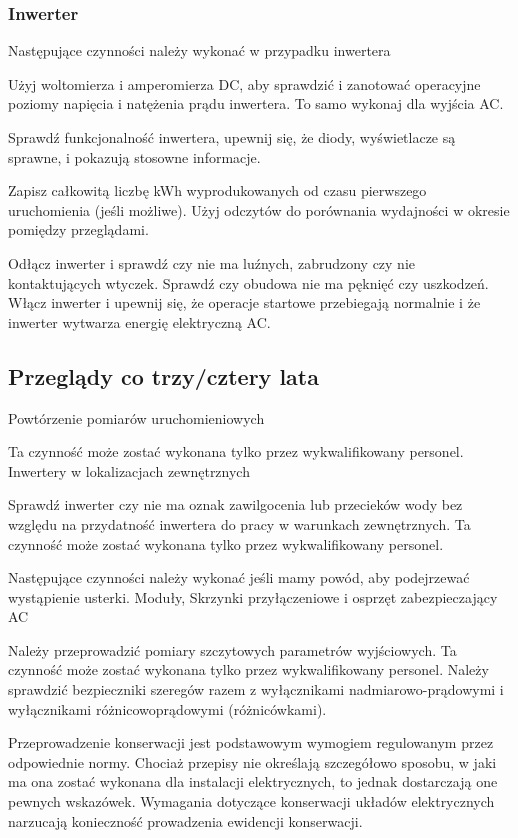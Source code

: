 \documentclass[12pt,a4paper]{article}
\begin{document}
\subsubsection{Inwerter}

Następujące czynności należy wykonać w przypadku inwertera 

 

Użyj woltomierza i amperomierza DC, aby sprawdzić i zanotować operacyjne 
poziomy napięcia i natężenia prądu inwertera. To samo wykonaj dla 
wyjścia AC. 

Sprawdź funkcjonalność inwertera, upewnij się, że diody, wyświetlacze są 
sprawne, i pokazują stosowne informacje. 

Zapisz całkowitą liczbę kWh wyprodukowanych od czasu pierwszego 
uruchomienia (jeśli możliwe). Użyj odczytów do porównania wydajności w 
okresie pomiędzy przeglądami. 

Odłącz inwerter i sprawdź czy nie ma luźnych, zabrudzony czy nie 
kontaktujących wtyczek. Sprawdź czy obudowa nie ma pęknięć czy 
uszkodzeń. Włącz inwerter i upewnij się, że operacje startowe 
przebiegają normalnie i że inwerter wytwarza energię elektryczną AC. 

\subsection{Przeglądy co trzy/cztery lata}
  

Powtórzenie pomiarów uruchomieniowych 

Ta czynność może zostać wykonana tylko przez wykwalifikowany personel. 
Inwertery w lokalizacjach zewnętrznych 

Sprawdź inwerter czy nie ma oznak zawilgocenia lub przecieków wody bez 
względu na przydatność inwertera do pracy w warunkach zewnętrznych. Ta 
czynność może zostać wykonana tylko przez wykwalifikowany personel. 

Następujące czynności należy wykonać jeśli mamy powód, aby podejrzewać 
wystąpienie usterki. Moduły, Skrzynki przyłączeniowe i osprzęt 
zabezpieczający AC 

Należy przeprowadzić pomiary szczytowych parametrów wyjściowych. Ta 
czynność może zostać wykonana tylko przez wykwalifikowany personel. 
Należy sprawdzić bezpieczniki szeregów razem z wyłącznikami 
nadmiarowo-prądowymi i wyłącznikami różnicowoprądowymi (różnicówkami). 

 

Przeprowadzenie konserwacji jest podstawowym wymogiem regulowanym przez 
odpowiednie normy. Chociaż przepisy nie określają szczegółowo sposobu, w 
jaki ma ona zostać wykonana dla instalacji elektrycznych, to jednak 
dostarczają one pewnych wskazówek. Wymagania dotyczące konserwacji 
układów elektrycznych narzucają konieczność prowadzenia ewidencji 
konserwacji. 
\end{document}

